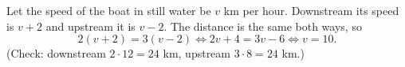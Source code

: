 Let the speed of the boat in still water be $v$ km per hour. Downstream its speed is $v+2$ and upstream it is $v-2$. The distance is the same both ways, so
\[2(v+2)=3(v-2)\iff 2v+4=3v-6\iff v=\boxed{10}.\]
(Check: downstream $2\cdot12=24$ km, upstream $3\cdot8=24$ km.)
